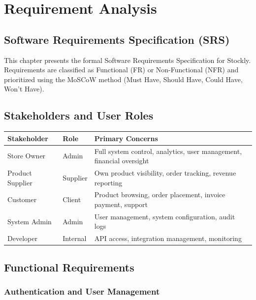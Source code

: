 \documentclass[12pt,a4paper]{report}
\begin{document}
\chapter{Requirement Analysis}

\section{Software Requirements Specification (SRS)}

This chapter presents the formal Software Requirements Specification for Stockly. Requirements are classified as Functional (FR) or Non-Functional (NFR) and prioritized using the MoSCoW method (Must Have, Should Have, Could Have, Won't Have).

\section{Stakeholders and User Roles}

\begin{center}
\begin{tabularx}{\textwidth}{llX}
  \toprule
  \textbf{Stakeholder} & \textbf{Role} & \textbf{Primary Concerns} \\
  \midrule
  Store Owner   & Admin    & Full system control, analytics, user management, financial oversight \\
  Product Supplier & Supplier & Own product visibility, order tracking, revenue reporting \\
  Customer      & Client   & Product browsing, order placement, invoice payment, support \\
  System Admin  & Admin    & User management, system configuration, audit logs \\
  Developer     & Internal & API access, integration management, monitoring \\
  \bottomrule
\end{tabularx}
\end{center}

\section{Functional Requirements}

\subsection{Authentication and User Management}
\end{document}

